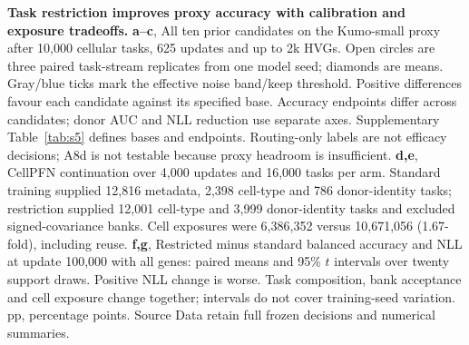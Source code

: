 \textbf{Task restriction improves proxy accuracy with calibration and exposure tradeoffs.} \textbf{a--c}, All ten prior candidates on the Kumo-small proxy after 10,000 cellular tasks, 625 updates and up to 2k HVGs. Open circles are three paired task-stream replicates from one model seed; diamonds are means. Gray/blue ticks mark the effective noise band/keep threshold. Positive differences favour each candidate against its specified base. Accuracy endpoints differ across candidates; donor AUC and NLL reduction use separate axes. Supplementary Table~\ref{tab:s5} defines bases and endpoints. Routing-only labels are not efficacy decisions; A8d is not testable because proxy headroom is insufficient. \textbf{d,e}, CellPFN continuation over 4,000 updates and 16,000 tasks per arm. Standard training supplied 12,816 metadata, 2,398 cell-type and 786 donor-identity tasks; restriction supplied 12,001 cell-type and 3,999 donor-identity tasks and excluded signed-covariance banks. Cell exposures were 6,386,352 versus 10,671,056 (1.67-fold), including reuse. \textbf{f,g}, Restricted minus standard balanced accuracy and NLL at update 100,000 with all genes: paired means and 95\% $t$ intervals over twenty support draws. Positive NLL change is worse. Task composition, bank acceptance and cell exposure change together; intervals do not cover training-seed variation. pp, percentage points. Source Data retain full frozen decisions and numerical summaries.
